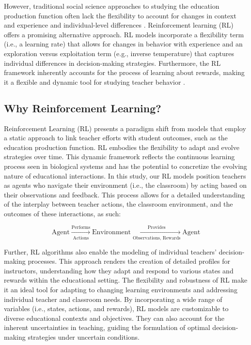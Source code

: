 \documentclass[
  number,
  preprint,
  3p,
  onecolumn]{elsarticle}
\begin{document}
However, traditional social science approaches to studying the education
production function often lack the flexibility to account for changes in
context and experience and individual-level differences . Reinforcement
learning (RL) offers a promising alternative approach. RL models
incorporate a flexibility term (i.e., a learning rate) that allows for
changes in behavior with experience and an exploration versus
exploitation term (e.g., inverse temperature) that captures individual
differences in decision-making strategies. Furthermore, the RL framework
inherently accounts for the process of learning about rewards, making it
a flexible and dynamic tool for studying teacher behavior
\citep{sutton2018}.

\subsection{Why Reinforcement
Learning?}\label{why-reinforcement-learning}

Reinforcement Learning (RL) presents a paradigm shift from models that
employ a static approach to link teacher efforts with student outcomes,
such as the education production function. RL embodies the flexibility
to adapt and evolve strategies over time. This dynamic framework
reflects the continuous learning process seen in biological systems and
has the potential to concretize the evolving nature of educational
interactions. In this study, our RL models position teachers as agents
who navigate their environment (i.e., the classroom) by acting based on
their observations and feedback. This process allows for a detailed
understanding of the interplay between teacher actions, the classroom
environment, and the outcomes of these interactions, as such:

\[
\text{Agent} \xrightarrow[\text{Actions}]{\text{Performs}} \text{Environment} \xrightarrow[\text{Observations, Rewards}]{\text{Provides}} \text{Agent}
\]

Further, RL algorithms also enable the modeling of individual teachers'
decision-making processes. This approach renders the creation of
detailed profiles for instructors, understanding how they adapt and
respond to various states and rewards within the educational setting.
The flexibility and robustness of RL make it an ideal tool for adapting
to changing learning environments and addressing individual teacher and
classroom needs. By incorporating a wide range of variables (i.e.,
states, actions, and rewards), RL models are customizable to diverse
educational contexts and objectives. They can also account for the
inherent uncertainties in teaching, guiding the formulation of optimal
decision-making strategies under uncertain conditions.
\end{document}
